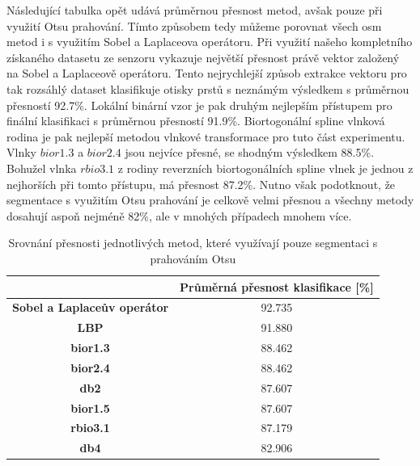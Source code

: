 Následující tabulka opět udává průměrnou přesnost metod, avšak pouze při využití Otsu prahování. Tímto způsobem tedy můžeme porovnat všech osm metod i s využitím Sobel a Laplaceova operátoru. Při využití našeho kompletního získaného datasetu ze senzoru vykazuje největší přesnost právě vektor založený na Sobel a Laplaceově operátoru. Tento nejrychlejší způsob extrakce vektoru pro tak rozsáhlý dataset klasifikuje otisky prstů s neznámým výsledkem s průměrnou přesností 92.7\%. Lokální binární vzor je pak druhým nejlepším přístupem pro finální klasifikaci s průměrnou přesností 91.9\%. Biortogonální spline vlnková rodina je pak nejlepší metodou vlnkové transformace pro tuto část experimentu. Vlnky $bior1.3$ a $bior2.4$ jsou nejvíce přesné, se shodným výsledkem 88.5\%. Bohužel vlnka $rbio3.1$ z rodiny reverzních biortogonálních spline vlnek je jednou z nejhorších při tomto přístupu, má přesnost 87.2\%. Nutno však podotknout, že segmentace s využitím Otsu prahování je celkově velmi přesnou a všechny metody dosahují aspoň nejméně 82\%, ale v mnohých případech mnohem více.

\capstartfalse
\begin{table}[!htbp]
\centering
\begin{tabular}{|c|c|}
\hline
                                    & \textbf{Průměrná přesnost klasifikace {[}\%{]}} \\ \hline
\textbf{Sobel a Laplaceův operátor}                        & 92.735                                         \\ \hline
\textbf{LBP}                    & 91.880                                         \\ \hline
\textbf{bior1.3}                    & 88.462                                         \\ \hline
\textbf{bior2.4} & 88.462                                         \\ \hline
\textbf{db2}                    & 87.607                                         \\ \hline
\textbf{bior1.5}                        & 87.607                                       \\ \hline
\textbf{rbio3.1}                        & 87.179                                         \\ \hline
\textbf{db4}                    & 82.906                                         \\ \hline
\end{tabular}
\caption{Srovnání přesnosti jednotlivých metod, které využívají pouze segmentaci s prahováním Otsu}
\end{table}
\capstarttrue

